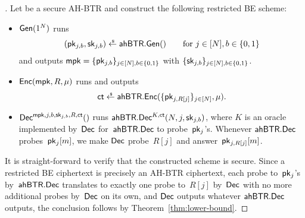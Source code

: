 \begin{proof}[]
Let
be a secure AH-BTR and
construct the following restricted BE scheme:
\begin{itemize}
\item $\Gen(1^N)$ runs
\begin{align*}
(\pk_{j,b},\sk_{j,b})\draws\AHBTR.\Gen()\qquad\textup{for }j\in[N],b\in\bit
\end{align*}
and outputs ${\mpk=\{\pk_{j,b}\}_{j\in[N],b\in\bit}}$ with $\{\sk_{j,b}\}_{j\in[N],b\in\bit}$.
\item $\Enc(\mpk,R,\mu)$ runs and outputs
\begin{align*}
\ct\draws\AHBTR.\Enc(\{\pk_{j,R[j]}\}_{j\in[N]},\mu).
\end{align*}
\item $\Dec^{\mpk,j,b,\sk_{j,b},R,\ct}()$
runs $\AHBTR.\Dec^{K,\ct}(N,j,\sk_{j,b})$,
where $K$ is an oracle implemented by~$\Dec$ for~$\AHBTR.\Dec$ to probe~$\pk_j$'s.
Whenever $\AHBTR.\Dec$ probes~$\pk_j[m]$,
we make $\Dec$ probe~$R[j]$ and answer~$\pk_{j,R[j]}[m]$.
\end{itemize}
It is straight-forward to verify that the constructed scheme is secure.
Since
a restricted BE ciphertext is precisely an AH-BTR ciphertext,
each probe to~$\pk_j$'s by~$\AHBTR.\Dec$ translates to exactly one probe to~$R[j]$ by~$\Dec$ with no more additional probes by~$\Dec$ on its own, and
$\Dec$ outputs whatever $\AHBTR.\Dec$ outputs,
the conclusion follows by Theorem~\ref{thm:lower-bound}.
\end{proof}
